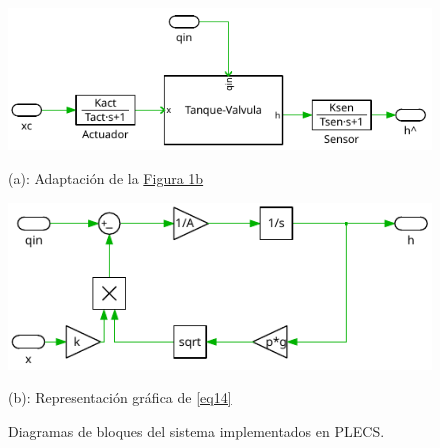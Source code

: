 \begin{figure}
    \centering
    \begin{minipage}{0.42\linewidth}
        \centering
        \includegraphics[width=\linewidth]{figs/actuador-tanque-sensor.pdf}
        \caption*{(a): Adaptación de la \hyperref[tanque]{Figura 1b}}
    \end{minipage}
    \begin{minipage}{0.42\linewidth}
        \centering
        \includegraphics[width=\linewidth]{figs/tanque.pdf}
        \caption*{(b): Representación gráfica de \ref{eq14}}
    \end{minipage}
    \caption{Diagramas de bloques del sistema implementados en PLECS.}
    \label{db}
\end{figure}

